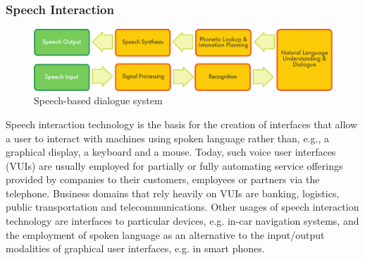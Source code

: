 \documentclass[]{../../metanetpaper}
\begin{document}
\begin{multicols}{2}
\subsubsection{Speech Interaction}

\begin{figure}[htb]
  \center
  \includegraphics[width=\textwidth]{../_media/english/simple_speech-based_dialogue_architecture}
  \caption{Speech-based dialogue system}
  \label{fig:dialoguearch_en}
\end{figure}

Speech interaction technology is the basis for the creation of interfaces that allow a user to interact with machines using spoken language rather than, e.g., a graphical display, a keyboard and a mouse. Today, such voice user interfaces (VUIs) are usually employed for partially or fully automating service offerings provided by companies to their customers, employees or partners via the telephone. Business domains that rely heavily on VUIs are banking, logistics, public transportation and telecommunications. Other usages of speech interaction technology are interfaces to particular devices, e.g. in-car navigation systems, and the employment of spoken language as an alternative to the input/output modalities of graphical user interfaces, e.g. in smart phones.


\end{multicols}
\end{document}
